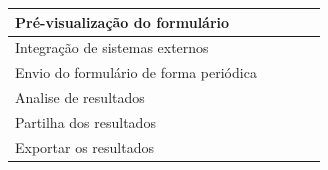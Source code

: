 \begin{table}[!ht]
\begin{tabular}{|p{4cm}|p{1.5cm}|p{1.5cm}|p{1.5cm}|p{1.5cm}|}
			 Pré-visualização do formulário& \cellcolor{blue!25}   & \cellcolor{blue!25}  & \cellcolor{blue!25} & \cellcolor{blue!25}  \\ \hline
			
			 Integração de sistemas externos& \cellcolor{blue!25}   & \cellcolor{blue!25}  & \cellcolor{blue!25} & \cellcolor{blue!25}  \\ \hline
			
			Envio do formulário de forma periódica & \cellcolor{blue!25}   & \cellcolor{blue!25}  & \cellcolor{blue!25} & \cellcolor{blue!25}  \\ \hline
			
			 Analise de resultados & \cellcolor{blue!25}   & \cellcolor{blue!25}  & \cellcolor{blue!25} & \cellcolor{blue!25}  \\ \hline
			
			Partilha dos resultados & \cellcolor{blue!25}   & \cellcolor{blue!25}  & \cellcolor{blue!25} & \cellcolor{blue!25}  \\ \hline
			
			Exportar os resultados & \cellcolor{blue!25}   & \cellcolor{blue!25}  & \cellcolor{blue!25} & \cellcolor{blue!25}  \\ \hline
			
			
		\end{tabular}

	\end{table}


\blankpage

\glsresetall



